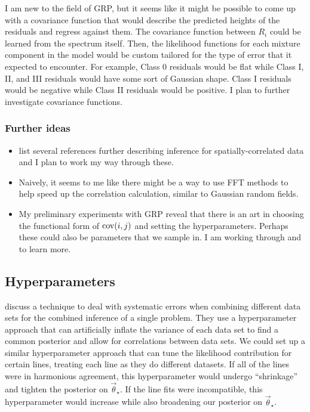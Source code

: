 \documentclass[preprint]{aastex} %
\newcommand{\vt}{\vec{\theta}}
\newcommand{\vstar}{\vt_{\star}}
\begin{document}
I am new to the field of GRP, but it seems like it might be possible to come up with a covariance function that would describe the predicted heights of the residuals and regress against them. The covariance function between $R_i$ could be learned from the spectrum itself. Then, the likelihood functions for each mixture component in the model would be custom tailored for the type of error that it expected to encounter. For example, Class 0 residuals would be flat while Class I, II, and III residuals would have some sort of Gaussian shape. Class I residuals would be negative while Class II residuals would be positive. I plan to further investigate covariance functions. 

\subsubsection{Further ideas}
\begin{itemize}
  \item \citet[ch. 18]{gcs+04} list several references further describing inference for spatially-correlated data and I plan to work my way through these. 
  \item Naively, it seems to me like there might be a way to use FFT methods to help speed up the correlation calculation, similar to Gaussian random fields.
  \item My preliminary experiments with GRP reveal that there is an art in choosing the functional form of ${\rm cov}(i, j)$ and setting the hyperparameters. Perhaps these could also be parameters that we sample in. I am working through \citet{rw05} and \citet[Ch 21.]{gcs+13} to learn more.
\end{itemize}

\subsection{Hyperparameters}
\citet{mb13} discuss a technique to deal with systematic errors when combining different data sets for the combined inference of a single problem. They use a hyperparameter approach that can artificially inflate the variance of each data set to find a common posterior and allow for correlations between data sets. We could set up a similar hyperparameter approach that can tune the likelihood contribution for certain lines, treating each line as they do different datasets. If all of the lines were in harmonious agreement, this hyperparameter would undergo ``shrinkage'' \citep{kru10} and tighten the posterior on $\vstar$. If the line fits were incompatible, this hyperparameter would increase while also broadening our posterior on $\vstar$.
\end{document}
